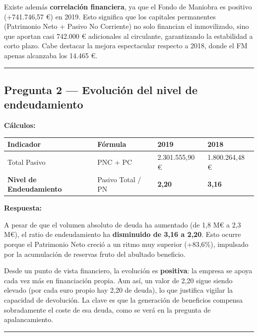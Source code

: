 \documentclass[12pt]{book} %
\begin{document}
Existe además \textbf{correlación financiera}, ya que el Fondo de
Maniobra es positivo (+741.746,57 €) en 2019. Esto significa que los
capitales permanentes (Patrimonio Neto + Pasivo No Corriente) no solo
financian el inmovilizado, sino que aportan casi 742.000 € adicionales
al circulante, garantizando la estabilidad a corto plazo. Cabe destacar
la mejora espectacular respecto a 2018, donde el FM apenas alcanzaba los
14.465 €.

\begin{center}\rule{0.5\linewidth}{0.5pt}\end{center}

\hypertarget{pregunta-2-evoluciuxf3n-del-nivel-de-endeudamiento}{%
\subsection{Pregunta 2 --- Evolución del nivel de
endeudamiento}\label{pregunta-2-evoluciuxf3n-del-nivel-de-endeudamiento}}

\textbf{Cálculos:}

\begin{longtable}[]{@{}llll@{}}
\toprule\noalign{}
Indicador & Fórmula & 2019 & 2018 \\
\midrule\noalign{}
\endhead
\bottomrule\noalign{}
\endlastfoot
Total Pasivo & PNC + PC & 2.301.555,90 € & 1.800.264,48 € \\
\textbf{Nivel de Endeudamiento} & Pasivo Total / PN & \textbf{2,20} &
\textbf{3,16} \\
\end{longtable}

\textbf{Respuesta:}

A pesar de que el volumen absoluto de deuda ha aumentado (de 1,8 M€ a
2,3 M€), el ratio de endeudamiento ha \textbf{disminuido de 3,16 a
2,20}. Esto ocurre porque el Patrimonio Neto creció a un ritmo muy
superior (+83,6\%), impulsado por la acumulación de reservas fruto del
abultado beneficio.

Desde un punto de vista financiero, la evolución es \textbf{positiva}:
la empresa se apoya cada vez más en financiación propia. Aun así, un
valor de 2,20 sigue siendo elevado (por cada euro propio hay 2,20 de
deuda), lo que justifica vigilar la capacidad de devolución. La clave es
que la generación de beneficios compensa sobradamente el coste de esa
deuda, como se verá en la pregunta de apalancamiento.

\begin{center}\rule{0.5\linewidth}{0.5pt}\end{center}
\end{document}
